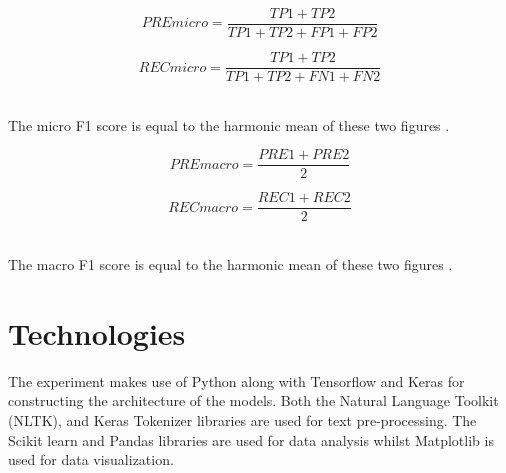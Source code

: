 \begin{equation}
  PREmicro = \frac{TP1 + TP2}{TP1 + TP2 + FP1 + FP2}
\end{equation}

\begin{equation}
  RECmicro = \frac{TP1 + TP2}{TP1 + TP2 + FN1 + FN2}
\end{equation}

\noindent
\\ The micro F1 score is equal to the harmonic mean of these two figures \citep{shams_1970}.

\begin{equation}
  PREmacro = \frac{PRE1 + PRE2}{2}
\end{equation}

\begin{equation}
  RECmacro = \frac{REC1 + REC2}{2}
\end{equation}

\noindent
\\ The macro F1 score is equal to the harmonic mean of these two figures \citep{shams_1970}. 

\section{Technologies}

The experiment makes use of Python along with Tensorflow and Keras for constructing the architecture of the models. Both the Natural Language Toolkit (NLTK), and Keras Tokenizer libraries are used for text pre-processing. The Scikit learn and Pandas libraries are used for data analysis whilst Matplotlib is used for data visualization. 





  